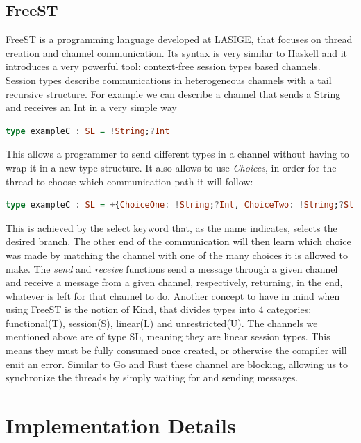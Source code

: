 \documentclass[runningheads]{llncs}
\begin{document}
\subsection{FreeST}
FreeST is a programming language developed at LASIGE, that focuses on thread creation and channel communication. Its syntax is very similar to Haskell and it introduces a very powerful tool: context-free session types based channels.\\
Session types describe communications in heterogeneous channels with a tail recursive structure\cite{session}.
For example we can describe a channel that sends a String and receives an Int in a very simple way
\begin{lstlisting}[language=haskell]
type exampleC : SL = !String;?Int
\end{lstlisting}
This allows a programmer to send different types in a channel without having to wrap it in a new type structure.
It also allows to use {\it Choices}, in order for the thread to choose which communication path it will follow:
\begin{lstlisting}[language=haskell]
type exampleC : SL = +{ChoiceOne: !String;?Int, ChoiceTwo: !String;?String}
\end{lstlisting}
This is achieved by the select keyword that, as the name indicates, selects the desired branch. The other end of the communication will then learn which choice was made by matching the channel with one of the many choices it is allowed to make.
The {\it send} and {\it receive} functions send a message through a given channel and receive a message from a given channel, respectively, returning, in the end, whatever is left for that channel to do.
Another concept to have in mind when using FreeST is the notion of Kind, that divides types into 4 categories:
functional(T), session(S), linear(L) and unrestricted(U).
The channels we mentioned above are of type SL, meaning they are linear session types. This means they must be fully consumed once created, or otherwise the compiler will emit an error.
Similar to Go and Rust these channel are blocking, allowing us to synchronize the threads by simply waiting for and sending messages.
\section{Implementation Details}
\end{document}
